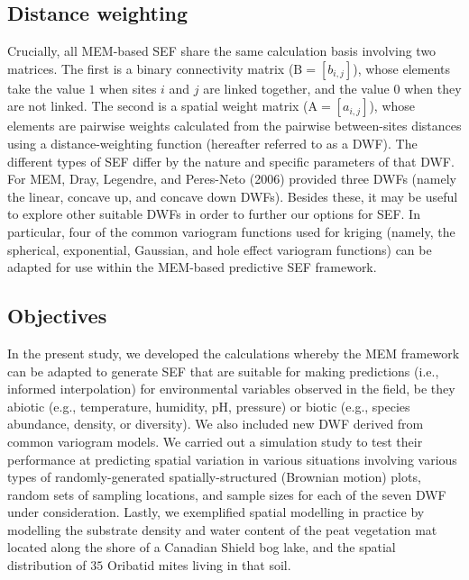\documentclass[
]{article}
\begin{document}
\subsection{Distance weighting}\label{distance-weighting}

Crucially, all MEM-based SEF share the same calculation basis involving
two matrices. The first is a binary connectivity matrix
(\(\mathrm{B} = [b_{i,j}]\)), whose elements take the value \(1\) when
sites \(i\) and \(j\) are linked together, and the value \(0\) when they
are not linked. The second is a spatial weight matrix
(\(\mathrm{A} = [a_{i,j}]\)), whose elements are pairwise weights
calculated from the pairwise between-sites distances using a
distance-weighting function (hereafter referred to as a DWF). The
different types of SEF differ by the nature and specific parameters of
that DWF. For MEM, Dray, Legendre, and Peres-Neto (2006) provided three
DWFs (namely the linear, concave up, and concave down DWFs). Besides
these, it may be useful to explore other suitable DWFs in order to
further our options for SEF. In particular, four of the common variogram
functions used for kriging (namely, the spherical, exponential,
Gaussian, and hole effect variogram functions) can be adapted for use
within the MEM-based predictive SEF framework.

\subsection{Objectives}\label{objectives}

In the present study, we developed the calculations whereby the MEM
framework can be adapted to generate SEF that are suitable for making
predictions (i.e., informed interpolation) for environmental variables
observed in the field, be they abiotic (e.g., temperature, humidity, pH,
pressure) or biotic (e.g., species abundance, density, or diversity). We
also included new DWF derived from common variogram models. We carried
out a simulation study to test their performance at predicting spatial
variation in various situations involving various types of
randomly-generated spatially-structured (Brownian motion) plots, random
sets of sampling locations, and sample sizes for each of the seven DWF
under consideration. Lastly, we exemplified spatial modelling in
practice by modelling the substrate density and water content of the
peat vegetation mat located along the shore of a Canadian Shield bog
lake, and the spatial distribution of \(35\) Oribatid mites living in
that soil.
\end{document}
